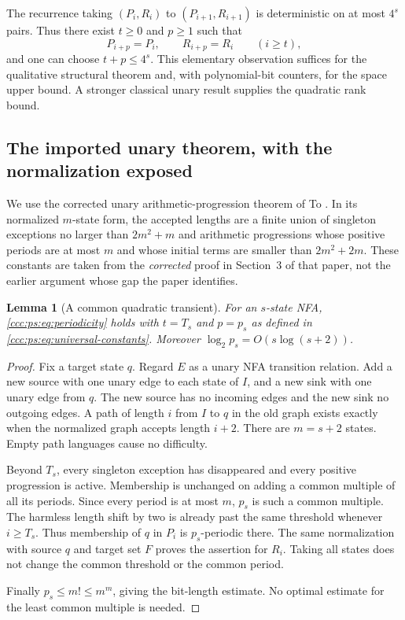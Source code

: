 \documentclass[11pt,letterpaper]{article}
\newtheorem{lemma}[theorem]{Lemma}
\theoremstyle{definition}
\theoremstyle{remark}
\begin{document}
The recurrence taking $(P_i,R_i)$ to $(P_{i+1},R_{i+1})$ is deterministic
on at most $4^s$ pairs. Thus there exist $t\ge0$ and $p\ge1$ such that
\begin{equation}\label{ccc:ps:eq:periodicity}
 P_{i+p}=P_i,\qquad R_{i+p}=R_i\qquad(i\ge t),
\end{equation}
and one can choose $t+p\le4^s$. This elementary observation suffices for
the qualitative structural theorem and, with polynomial-bit counters,
for the space upper bound. A stronger classical unary result supplies the
quadratic rank bound.

\subsection{The imported unary theorem, with the normalization exposed}

We use the corrected unary arithmetic-progression theorem of To
\cite{To}. In its normalized $m$-state form, the accepted lengths are a
finite union of singleton exceptions no larger than $2m^2+m$ and
arithmetic progressions whose positive periods are at most $m$ and whose
initial terms are smaller than $2m^2+2m$. These constants are taken from
the \emph{corrected} proof in Section~3 of that paper, not the earlier
argument whose gap the paper identifies.

\begin{lemma}[A common quadratic transient]\label{ccc:ps:lem:quadratic-period}
For an $s$-state NFA, \eqref{ccc:ps:eq:periodicity} holds with
$t=T_s$ and $p=p_s$ as defined in \eqref{ccc:ps:eq:universal-constants}.
Moreover $\log_2 p_s=O(s\log(s+2))$.
\end{lemma}
\begin{proof}
Fix a target state $q$. Regard $E$ as a unary NFA transition relation.
Add a new source with one unary edge to each state of $I$, and a new sink
with one unary edge from $q$. The new source has no incoming edges and
the new sink no outgoing edges. A path of length $i$ from $I$ to $q$ in
the old graph exists exactly when the normalized graph accepts length
$i+2$. There are $m=s+2$ states. Empty path languages cause no difficulty.

Beyond $T_s$, every singleton exception has disappeared and every positive
progression is active. Membership is unchanged on adding a common
multiple of all its periods. Since every period is at most $m$, $p_s$
is such a common multiple. The harmless length shift by two is already
past the same threshold whenever $i\ge T_s$. Thus membership of $q$ in
$P_i$ is $p_s$-periodic there. The same normalization with source $q$ and
target set $F$ proves the assertion for $R_i$. Taking all states does not
change the common threshold or the common period.

Finally $p_s\le m!\le m^m$, giving the bit-length estimate. No optimal
estimate for the least common multiple is needed.
\end{proof}
\end{document}
